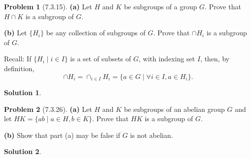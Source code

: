 \documentclass[12pt]{article}
\theoremstyle{definition}
\newtheorem*{prob}{Problem}
\newtheorem*{soln}{Solution}
\begin{document}
\begin{prob}[7.3.15] \text{ }
\textbf{(a)}   Let $H$ and $K$ be subgroups of a group $G$. 
Prove that $H \cap K$ is a subgroup of  $G$.  

\textbf{(b)}   Let $\{H_i\}$ be any collection of  subgroups of  $G$. 
Prove that $\cap H_i$ is a subgroup of  $G$.

Recall: If $\{ H_i \mid i \in I \}$ is a set of subsets of $G$, with indexing set $I$,
then, by definition, 
\[
\cap H_i = \cap_{i \in I} H_i = \{ a \in G \mid \forall i \in I, a \in H_i \}.
\]
\end{prob}

\begin{soln}

\end{soln}

\begin{prob}[7.3.26] \text{ }
\textbf{(a)}   Let $H$ and $K$ be subgroups of  an abelian group $G$ and let 
$HK = \{ab \mid a\in H, b\in K\}$. Prove that $HK$ is a subgroup of  $G$.

\textbf{(b)} Show that part (a) may be false if  $G$ is not abelian.
\end{prob}

\begin{soln}

\end{soln}
\end{document}
